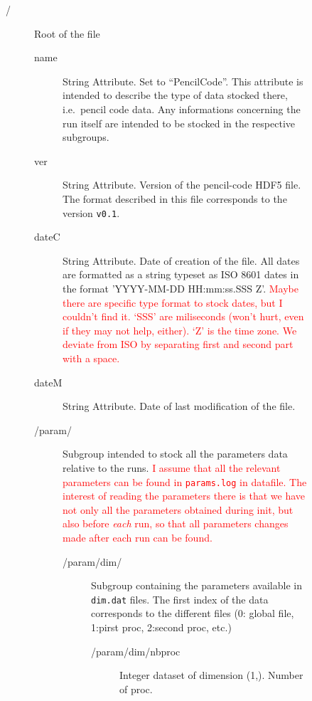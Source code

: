 \documentclass[a4paper,12pt]{article}
\newcommand{\note}[1]{\textcolor{red}{#1}}
\begin{document}
\begin{figure}[p] \centering
  \parbox{18cm}{\tiny %
    \begin{description}
    \item[/]  Root of the file
      \begin{description}
      \item[name] String Attribute. Set to ``PencilCode''. This attribute
        is intended to describe the type of data stocked there,
        i.e.\  pencil code data. Any informations concerning the run itself
    are intended to be stocked in the respective subgroups.
  \item[ver] String Attribute. Version of the
    pencil-code HDF5 file. The format described in this file
    corresponds to the version \texttt{v0.1}. 
  \item[dateC] String Attribute. Date of creation of the
    file. All dates are formatted as a string typeset as ISO 8601 dates in
    the format 'YYYY-MM-DD HH:mm:ss.SSS Z'.
    \note{Maybe there are specific type format to stock dates,
      but I couldn't find it.}%
    \note{`SSS' are miliseconds (won't hurt, even if they may not help,
      either).
      `Z' is the time zone.
      We deviate from ISO by separating first and second part with a space.
    }
  \item[dateM] String Attribute. Date of last modification of the
    file.
  \item[/param/] Subgroup intended to stock all the parameters data
    relative to the runs. \note{I assume that all the relevant
      parameters can be found in \texttt{params.log} in datafile. The interest
      of reading the parameters there is that we have not only all the
      parameters obtained during init, but also before \emph{each} run,
      so that all parameters changes made after each run can be
      found.}
    \begin{description}
    \item[/param/dim/] Subgroup containing the parameters available in
      \texttt{dim.dat} files. The first index of the data corresponds
      to the different files (0: global file, 1:pirst proc, 2:second
      proc, etc.)
      \begin{description}
      \item[/param/dim/nbproc] Integer dataset of dimension
        (1,). Number of proc.

\end{description}
\end{description}
\end{description}
\end{description}}
\end{figure}
\end{document}
